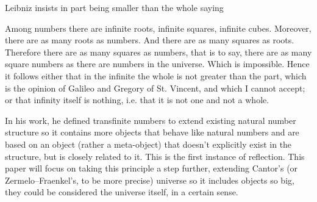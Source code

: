 \documentclass[12pt,a4paper]{article}
\begin{document}
Leibniz insists in part being smaller than the whole saying
\begin{displayquote}
Among numbers there are infinite roots, infinite squares, infinite cubes. Moreover, there are
as many roots as numbers. And there are as many squares as roots. Therefore there are as
many squares as numbers, that is to say, there are as many square numbers as there are
numbers in the universe. Which is impossible. Hence it follows either that in the infinite the
whole is not greater than the part, which is the opinion of Galileo and Gregory of St.
Vincent, and which I cannot accept; or that infinity itself is nothing, i.e. that it is not one and
not a whole. %
\end{displayquote}

In his work, he defined transfinite numbers to extend existing natural number %
structure so it contains more objects that behave like natural numbers and are based on an object (rather a meta-object) that doesn't explicitly exist in the structure, but is closely related to it. This is the first instance of reflection. 
This paper will focus on taking this principle a step further, extending Cantor's (or Zermelo–Fraenkel's, to be more precise) universe so it includes objects so big, they could be considered the universe itself, in a certain sense. %
\end{document}
